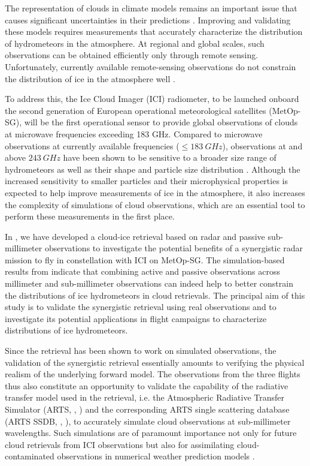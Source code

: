 \documentclass[journal abbreviation, manuscript]{copernicus}
\begin{document}
\introduction  %

The representation of clouds in climate models remains an important issue that
causes significant uncertainties in their predictions \citep{zelinka20}.
Improving and validating these models requires measurements that accurately
characterize the distribution of hydrometeors in the atmosphere. At regional and
global scales, such observations can be obtained efficiently only through remote
sensing. Unfortunately, currently available remote-sensing observations do not
constrain the distribution of ice in the atmosphere well \citep{waliser09,
  eliasson11, duncan18a}.

To address this, the Ice Cloud Imager (ICI) radiometer, to be launched onboard
the second generation of European operational meteorological satellites
(MetOp-SG), will be the first operational sensor to provide global observations
of clouds at microwave frequencies exceeding 183 GHz. Compared to microwave
observations at currently available frequencies ($\leq 183\ \unit{GHz}$),
observations at and above $243\ \unit{GHz}$ have been shown to be sensitive to a
broader size range of hydrometeors \citep{buehler12} as well as their shape and
particle size distribution \citep{evans98}. Although the increased sensitivity
to smaller particles and their microphysical properties is expected to help
improve measurements of ice in the atmosphere, it also increases the complexity
of simulations of cloud observations, which are an essential tool to perform
these measurements in the first place.

In \citet{pfreundschuh20}, we have developed a cloud-ice retrieval based on
radar and passive sub-millimeter observations to investigate the potential
benefits of a synergistic radar mission to fly in constellation with ICI on
MetOp-SG. The simulation-based results from \citet{pfreundschuh20} indicate that
combining active and passive observations across millimeter and sub-millimeter
observations can indeed help to better constrain the distributions of ice
hydrometeors in cloud retrievals. The principal aim of this study is to validate
the synergistic retrieval using real observations and to investigate its
potential applications in flight campaigns to characterize distributions of ice
hydrometeors.

Since the retrieval has been shown to work on simulated observations, the
validation of the synergistic retrieval essentially amounts to verifying the
physical realism of the underlying forward model. The observations from the
three flights thus also constitute an opportunity to validate the capability of
the radiative transfer model used in the retrieval, i.e. the
Atmospheric Radiative Transfer Simulator (ARTS, \citeauthor{arts18},
\citeyear{arts18}) and the corresponding ARTS single scattering database (ARTS
SSDB, \citeauthor{eriksson18}, \citeyear{eriksson18}), to accurately simulate
cloud observations at sub-millimeter wavelengths. Such simulations are of
paramount importance not only for future cloud retrievals from ICI observations
\citep{eriksson20} but also for assimilating cloud-contaminated observations in
numerical weather prediction models \citep{geer17}.
\end{document}
